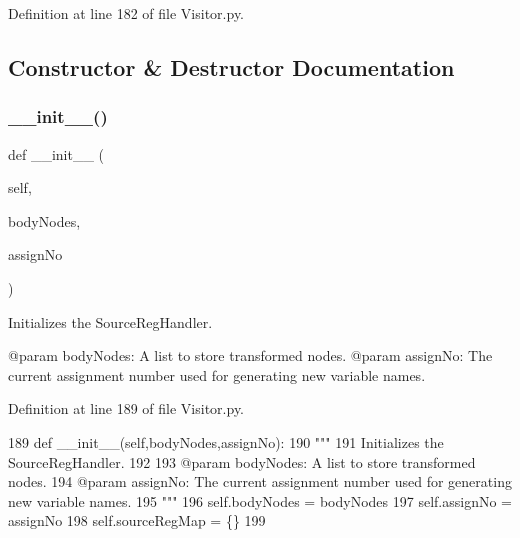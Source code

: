 Definition at line 182 of file Visitor.\+py.



\subsection{Constructor \& Destructor Documentation}
\mbox{\label{classPostProcessor_1_1Visitor_1_1SourceRegHandler_a3328eb3718a1907a8a24087b075a2062}} 
\subsubsection{\texorpdfstring{\+\_\+\+\_\+init\+\_\+\+\_\+()}{\_\_init\_\_()}}
{\footnotesize\ttfamily def \+\_\+\+\_\+init\+\_\+\+\_\+ (\begin{DoxyParamCaption}\item[{}]{self,  }\item[{}]{body\+Nodes,  }\item[{}]{assign\+No }\end{DoxyParamCaption})}

\begin{DoxyVerb}Initializes the SourceRegHandler.

@param bodyNodes: A list to store transformed nodes.
@param assignNo: The current assignment number used for generating new variable names.
\end{DoxyVerb}
 

Definition at line 189 of file Visitor.\+py.


\begin{DoxyCode}
189     \textcolor{keyword}{def }\_\_init\_\_(self,bodyNodes,assignNo):
190         \textcolor{stringliteral}{"""
}
191 \textcolor{stringliteral}{        Initializes the SourceRegHandler.
}
192 \textcolor{stringliteral}{
}
193 \textcolor{stringliteral}{        @param bodyNodes: A list to store transformed nodes.
}
194 \textcolor{stringliteral}{        @param assignNo: The current assignment number used for generating new variable names.
}
195 \textcolor{stringliteral}{        """}
196         self.bodyNodes = bodyNodes
197         self.assignNo = assignNo
198         self.sourceRegMap = \{\}
199     
\end{DoxyCode}


